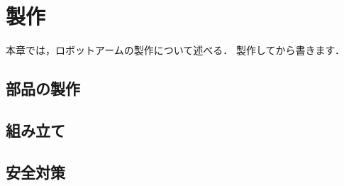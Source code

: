 \chapter{製作}
\label{chap:production}
%
本章では，ロボットアームの製作について述べる．
製作してから書きます．
%
\section{部品の製作}
\section{組み立て}
\section{安全対策}
%